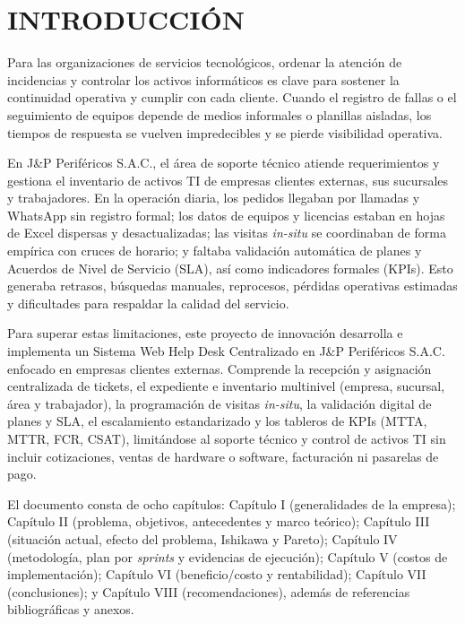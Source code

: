 \chapter*{INTRODUCCIÓN}

Para las organizaciones de servicios tecnológicos, ordenar la atención de incidencias y controlar los activos informáticos es clave para sostener la continuidad operativa y cumplir con cada cliente. Cuando el registro de fallas o el seguimiento de equipos depende de medios informales o planillas aisladas, los tiempos de respuesta se vuelven impredecibles y se pierde visibilidad operativa.

En J\&P Periféricos S.A.C., el área de soporte técnico atiende requerimientos y gestiona el inventario de activos TI de empresas clientes externas, sus sucursales y trabajadores. En la operación diaria, los pedidos llegaban por llamadas y WhatsApp sin registro formal; los datos de equipos y licencias estaban en hojas de Excel dispersas y desactualizadas; las visitas \textit{in-situ} se coordinaban de forma empírica con cruces de horario; y faltaba validación automática de planes y Acuerdos de Nivel de Servicio (SLA), así como indicadores formales (KPIs). Esto generaba retrasos, búsquedas manuales, reprocesos, pérdidas operativas estimadas y dificultades para respaldar la calidad del servicio.

Para superar estas limitaciones, este proyecto de innovación desarrolla e implementa un Sistema Web Help Desk Centralizado en J\&P Periféricos S.A.C. enfocado en empresas clientes externas. Comprende la recepción y asignación centralizada de tickets, el expediente e inventario multinivel (empresa, sucursal, área y trabajador), la programación de visitas \textit{in-situ}, la validación digital de planes y SLA, el escalamiento estandarizado y los tableros de KPIs (MTTA, MTTR, FCR, CSAT), limitándose al soporte técnico y control de activos TI sin incluir cotizaciones, ventas de hardware o software, facturación ni pasarelas de pago.

El documento consta de ocho capítulos: Capítulo I (generalidades de la empresa); Capítulo II (problema, objetivos, antecedentes y marco teórico); Capítulo III (situación actual, efecto del problema, Ishikawa y Pareto); Capítulo IV (metodología, plan por \textit{sprints} y evidencias de ejecución); Capítulo V (costos de implementación); Capítulo VI (beneficio/costo y rentabilidad); Capítulo VII (conclusiones); y Capítulo VIII (recomendaciones), además de referencias bibliográficas y anexos.